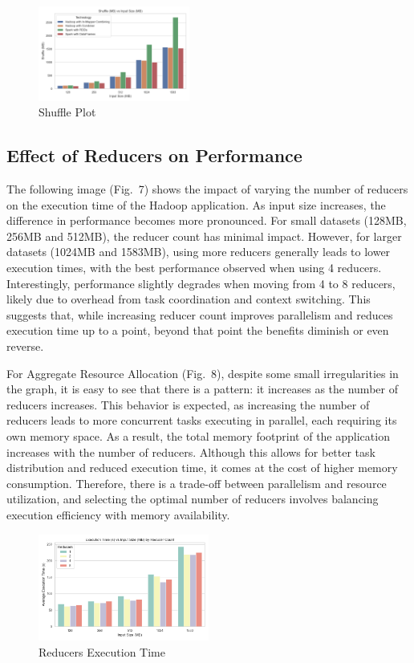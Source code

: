 \begin{figure}[H]
	\centering
	\includegraphics[width=0.444\textwidth]{images/Fig_Shuffle.png}
	\caption{Shuffle Plot}
	\label{fig:shuffle}
\end{figure}

\newpage

\subsection{Effect of Reducers on Performance}
The following image (Fig.~7) shows the impact of varying the number of reducers on the execution time of the Hadoop application. As input size increases, the difference in performance becomes more pronounced. For small datasets (128MB, 256MB and 512MB), the reducer count has minimal impact. However, for larger datasets (1024MB and 1583MB), using more reducers generally leads to lower execution times, with the best performance observed when using 4 reducers. Interestingly, performance slightly degrades when moving from 4 to 8 reducers, likely due to overhead from task coordination and context switching. This suggests that, while increasing reducer count improves parallelism and reduces execution time up to a point, beyond that point the benefits diminish or even reverse. 

For Aggregate Resource Allocation (Fig.~8), despite some small irregularities in the graph, it is easy to see that there is a pattern: it increases as the number of reducers increases. This behavior is expected, as increasing the number of reducers leads to more concurrent tasks executing in parallel, each requiring its own memory space. As a result, the total memory footprint of the application increases with the number of reducers. Although this allows for better task distribution and reduced execution time, it comes at the cost of higher memory consumption. Therefore, there is a trade-off between parallelism and resource utilization, and selecting the optimal number of reducers involves balancing execution efficiency with memory availability.

\begin{figure}[H]
	\centering
	\includegraphics[width=0.5\textwidth]{images/Fig_Reducers_Execution_Time.png}
	\caption{Reducers Execution Time}
	\label{fig:reducer-execution-time}
\end{figure}

